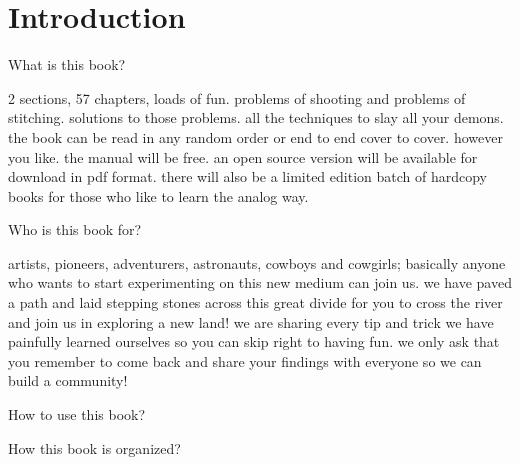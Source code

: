 
\chapter{Introduction}

{\large What is this book? \par}
\begin{fullwidth}

2 sections, 57 chapters, loads of fun.
problems of shooting and problems of stitching.
solutions to those problems.
all the techniques to slay all your demons.
the book can be read in any random order or end to end cover to cover.
however you like.
the manual will be free. an open source version will be available for download in pdf format. there will also be a limited edition batch of hardcopy books for those who like to learn the analog way.


\end{fullwidth}


{\large Who is this book for? \par}
\begin{fullwidth}

artists, pioneers, adventurers, astronauts, cowboys and cowgirls; basically anyone who wants to start experimenting on this new medium can join us. we have paved a path and laid stepping stones across this great divide for you to cross the river and join us in exploring a new land! we are sharing every tip and trick we have painfully learned ourselves so you can skip right to having fun. we only ask that you remember to come back and share your findings with everyone so we can build a community!

\end{fullwidth}

{\large How to use this book? \par}
\begin{fullwidth}
\end{fullwidth}

{\large How this book is organized? \par}
\begin{fullwidth}
\end{fullwidth}

